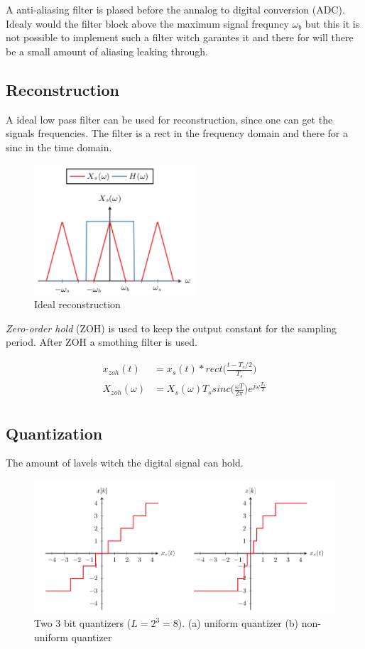 A anti-aliasing filter is plased before the annalog to digital conversion (ADC).
Idealy would the filter block above the maximum signal frequncy $\omega_b$ but this 
it is not possible to implement such a filter witch garantes it and there for will 
there be a small amount of aliasing leaking through.


\subsection{Reconstruction}
A ideal low pass filter can be used for reconstruction, since one can get the signals frequencies.
The filter is a rect in the frequency domain and there for a sinc in the time domain.
\begin{figure}[!h]
    \centering
    \includegraphics[width=6cm]{image/ideal_reconstruction.pdf}
    \caption{Ideal reconstruction}
    \label{fig:ideal_reconstcion}
\end{figure}

\textit{Zero-order hold} (ZOH) is used to keep the output constant for the sampling period.
After ZOH a smothing filter is used.

\begin{align*}
    x_{zoh}(t) &= x_s(t)*rect\Big(\frac{t-T_s/2}{T_s}\Big) \\
    X_{zoh}(\omega) &= X_s(\omega)T_s sinc\Big(\frac{\omega T}{2\pi}\Big)e^{j\omega\frac{T_s}{2}} \\
\end{align*}

\subsection{Quantization}
The amount of lavels witch the digital signal can hold.

\newpage
\begin{figure}[!h]
    \centering
    \includegraphics[width=12cm]{image/quantization.png}
    \caption{Two 3 bit quantizers ($L=2^3=8$). (a) uniform quantizer (b) non-uniform quantizer}
    \label{fig:quantization}
\end{figure}



